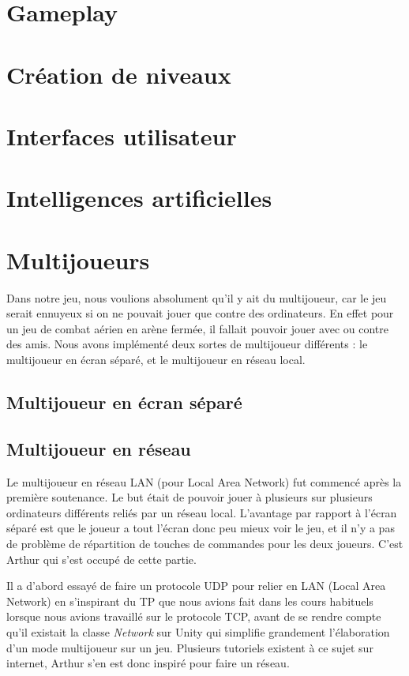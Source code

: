 \documentclass[12pt, titlepage]{article}
\begin{document}
\begin{spacing}{1.5}
\newpage
\section{Gameplay}

\newpage
\section{Création de niveaux}

\newpage
\section{Interfaces utilisateur}

\newpage
\section{Intelligences artificielles}

\newpage
\section{Multijoueurs}

Dans notre jeu, nous voulions absolument qu'il y ait du multijoueur, car le jeu serait ennuyeux si on ne pouvait jouer que contre des ordinateurs. En effet pour un jeu de combat aérien en arène fermée, il fallait pouvoir jouer avec ou contre des amis. Nous avons implémenté deux sortes de multijoueur différents : le multijoueur en écran séparé, et le multijoueur en réseau local.

\subsection{Multijoueur en écran séparé}

\subsection{Multijoueur en réseau}

Le multijoueur en réseau LAN (pour Local Area Network) fut commencé après la première soutenance. Le but était de pouvoir jouer à plusieurs sur plusieurs ordinateurs différents reliés par un réseau local. L'avantage par rapport à l'écran séparé est que le joueur a tout l'écran donc peu mieux voir le jeu, et il n'y a pas de problème de répartition de touches de commandes pour les deux joueurs. C'est Arthur qui s'est occupé de cette partie.

Il a d'abord essayé de faire un protocole UDP pour relier en LAN (Local Area Network) en s'inspirant du TP que nous avions fait dans les cours habituels lorsque nous avions travaillé sur le protocole TCP, avant de se rendre compte qu'il existait la classe \textit{Network} sur Unity qui simplifie grandement l'élaboration d'un mode multijoueur sur un jeu. Plusieurs tutoriels existent à ce sujet sur internet, Arthur s'en est donc inspiré pour faire un réseau.


\end{spacing}
\end{document}
